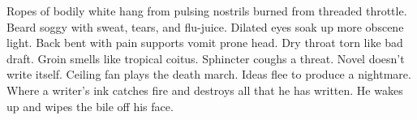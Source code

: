 \documentclass{article}
\begin{document}
\newline

Ropes of bodily white hang from pulsing nostrils burned from threaded
throttle. Beard soggy with sweat, tears, and flu-juice. Dilated eyes
soak up more obscene light. Back bent with pain supports vomit prone
head. Dry throat torn like bad draft. Groin smells like tropical coitus.
Sphincter coughs a threat. Novel doesn't write itself. Ceiling fan plays
the death march. Ideas flee to produce a nightmare. Where a writer's ink
catches fire and destroys all that he has written. He wakes up and wipes
the bile off his face.
\end{document}
